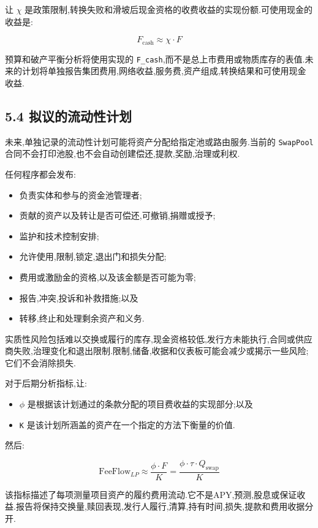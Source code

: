 \documentclass[11pt]{article}
\begin{document}
让 \texttt{$\chi$} 是政策限制,转换失败和滑坡后现金资格的收费收益的实现份额.可使用现金的收益是:

\[
F_{\mathrm{cash}} \approx \chi \cdot F
\]

预算和破产平衡分析将使用实现的 \texttt{F\_cash},而不是总上市费用或物质库存的表值.未来的计划将单独报告集团费用,网络收益,服务费,资产组成,转换结果和可使用现金收益.

\subsection*{5.4 拟议的流动性计划}

未来,单独记录的流动性计划可能将资产分配给指定池或路由服务.当前的 \texttt{SwapPool} 合同不会打印池股,也不会自动创建偿还,提款,奖励,治理或利权.

任何程序都会发布:

\begin{itemize}[leftmargin=*]
\item 负责实体和参与的资金池管理者;
\item 贡献的资产以及转让是否可偿还,可撤销,捐赠或授予;
\item 监护和技术控制安排;
\item 允许使用,限制,锁定,退出门和损失分配;
\item 费用或激励金的资格,以及该金额是否可能为零;
\item 报告,冲突,投诉和补救措施;以及
\item 转移,终止和处理剩余资产和义务.
\end{itemize}
实质性风险包括难以交换或履行的库存,现金资格较低,发行方未能执行,合同或供应商失败,治理变化和退出限制.限制,储备,收据和仪表板可能会减少或揭示一些风险;它们不会消除损失.

对于后期分析指标,让:

\begin{itemize}[leftmargin=*]
\item \texttt{$\phi$} 是根据该计划通过的条款分配的项目费收益的实现部分;以及
\item \texttt{K} 是该计划所涵盖的资产在一个指定的方法下衡量的价值.
\end{itemize}
然后:

\[
\mathrm{FeeFlow}_{LP} \approx \frac{\phi \cdot F}{K} = \frac{\phi \cdot \tau \cdot Q_{\mathrm{swap}}}{K}
\]

该指标描述了每项测量项目资产的履约费用流动.它不是APY,预测,股息或保证收益.报告将保持交换量,赎回表现,发行人履行,清算,持有时间,损失,提款和费用收据分开.
\end{document}
